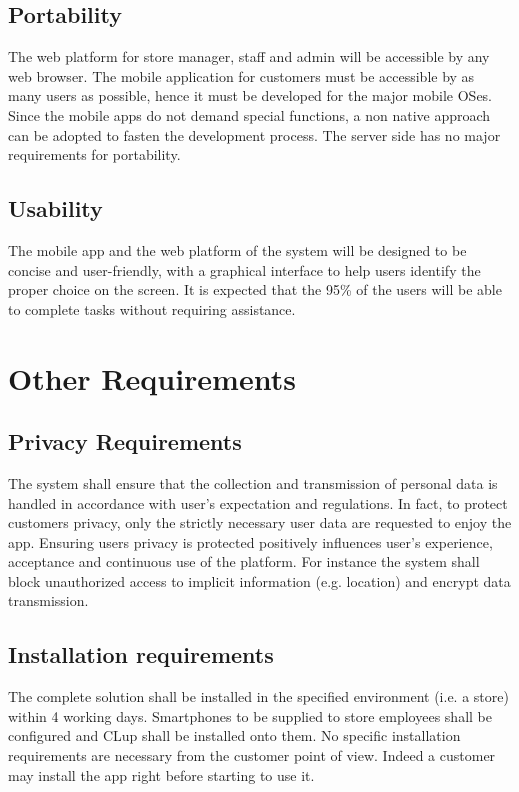 \subsection{Portability}
The web platform for store manager, staff and admin will be accessible by any web browser.\newline
The mobile application for customers must be accessible by as many users as possible, hence it must be developed for the major mobile OSes. Since the mobile apps do not demand special functions, a non native approach can be adopted to fasten the development process.
The server side has no major requirements for portability.

\subsection{Usability}
The mobile app and the web platform of the system will be designed to be concise and user-friendly, with a graphical interface to help users identify the proper choice on the screen. It is expected that the 95\% of the users will be able to complete tasks without requiring assistance.

\section{Other Requirements}

\subsection{Privacy Requirements}\label{req:privacy}
The system shall ensure that the collection and transmission of personal data is handled in accordance with user’s expectation and regulations.\newline
In fact, to protect customers privacy, only the strictly necessary user data are requested to enjoy the app. Ensuring users privacy is protected positively influences user’s experience, acceptance and continuous use of the platform. For instance the system shall block unauthorized access to implicit information (e.g. location) and encrypt data transmission.

\subsection{Installation requirements}
The complete solution shall be installed in the specified environment (i.e. a store) within 4 working days.\newline
Smartphones to be supplied to store employees shall be configured and CLup shall be installed onto them.\newline
No specific installation requirements are necessary from the customer point of view. Indeed a customer may install the app right before starting to use it.
